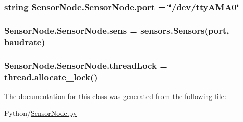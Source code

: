 \subsubsection[{\texorpdfstring{port}{port}}]{\setlength{\rightskip}{0pt plus 5cm}string Sensor\+Node.\+Sensor\+Node.\+port = \char`\"{}/dev/tty\+A\+M\+A0\char`\"{}\hspace{0.3cm}{\ttfamily [static]}}\hypertarget{classSensorNode_1_1SensorNode_a94712cd1b0bf09fa4cd3de94ca666575}{}\label{classSensorNode_1_1SensorNode_a94712cd1b0bf09fa4cd3de94ca666575}
\subsubsection[{\texorpdfstring{sens}{sens}}]{\setlength{\rightskip}{0pt plus 5cm}Sensor\+Node.\+Sensor\+Node.\+sens = {\bf sensors.\+Sensors}({\bf port}, {\bf baudrate})\hspace{0.3cm}{\ttfamily [static]}}\hypertarget{classSensorNode_1_1SensorNode_ad8aec254c15c97a8b5c709480f31b2bb}{}\label{classSensorNode_1_1SensorNode_ad8aec254c15c97a8b5c709480f31b2bb}
\subsubsection[{\texorpdfstring{thread\+Lock}{threadLock}}]{\setlength{\rightskip}{0pt plus 5cm}Sensor\+Node.\+Sensor\+Node.\+thread\+Lock = thread.\+allocate\+\_\+lock()\hspace{0.3cm}{\ttfamily [static]}}\hypertarget{classSensorNode_1_1SensorNode_a6453b42daae16cdc043bea6825374162}{}\label{classSensorNode_1_1SensorNode_a6453b42daae16cdc043bea6825374162}


The documentation for this class was generated from the following file\+:\begin{DoxyCompactItemize}
\item 
Python/\hyperlink{SensorNode_8py}{Sensor\+Node.\+py}\end{DoxyCompactItemize}
